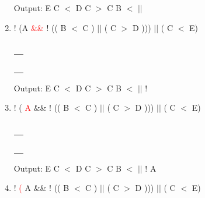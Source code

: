 \documentclass[a4paper]{article}
\begin{document}
\begin{large}
\begin{enumerate}
\begin{tabular}[t]{ | p{1.6em} | }
            \makecell{ $||$ } \\ \hline
          \end{tabular}
          \hspace{2em}
          Output: E C $<$ D C $>$ C B $<$ $||$
          \newpage
    \item
          ! (A  \textcolor{red}{\&\&} ! (( B $<$ C ) $||$ ( C $>$ D ))) $||$ ( C $<$ E)\\
          \\
          \begin{tabular}[t]{ | p{1.6em} | }
            \makecell{}       \\ \hline
            \makecell{}       \\ \hline
            \makecell{}       \\ \hline
            \makecell{\&\&}   \\ \hline
            \makecell{)}      \\ \hline
            \makecell{ $||$ } \\ \hline
          \end{tabular}
          \hspace{2em}
          Output: E C $<$ D C $>$ C B $<$ $||$ !
    \item
          ! (  \textcolor{red}{A} \&\& ! (( B $<$ C ) $||$ ( C $>$ D ))) $||$ ( C $<$ E)\\
          \\
          \begin{tabular}[t]{ | p{1.6em} | }
            \makecell{}       \\ \hline
            \makecell{}       \\ \hline
            \makecell{}       \\ \hline
            \makecell{\&\&}   \\ \hline
            \makecell{)}      \\ \hline
            \makecell{ $||$ } \\ \hline
          \end{tabular}
          \hspace{2em}
          Output: E C $<$ D C $>$ C B $<$ $||$ ! A
    \item
          ! \textcolor{red}{(} A \&\& ! (( B $<$ C ) $||$ ( C $>$ D ))) $||$ ( C $<$ E)\\
          \\
          \begin{tabular}[t]{ | p{1.6em} | }
            \makecell{}       \\ \hline

\end{tabular}
\end{enumerate}
\end{large}
\end{document}
